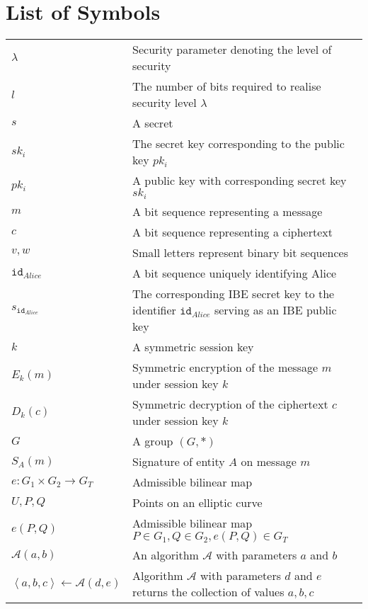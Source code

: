 \documentclass[master=eelt,masteroption=em]{kulemt}
\theoremstyle{plain}
\theoremstyle{definition}
\newcommand{\id}[1]{\ensuremath{\mathtt{id}_{#1}}}
\begin{document}
\chapter{List of Symbols}
\begin{flushleft}
 \renewcommand{\arraystretch}{1.1}
 \begin{tabularx}{\textwidth}{@{}p{30mm}X@{}}
  $\lambda$ & Security parameter denoting the level of security \\
  $l$ & The number of bits required to realise security level $\lambda$ \\
  $s$ & A secret \\
  $sk_i$ & The secret key corresponding to the public key $pk_i$ \\
  $pk_i$ & A public key with corresponding secret key $sk_i$ \\
  $m$ & A bit sequence representing a message \\
  $c$ & A bit sequence representing a ciphertext \\
  $v, w$ & Small letters represent binary bit sequences \\
  \id{Alice} & A bit sequence uniquely identifying Alice \\ 
  $s_{\id{Alice}}$ & The corresponding IBE secret key to the identifier \id{Alice} serving as an IBE public key \\
  $k$ & A symmetric session key \\
  $E_k \left( m \right)$ & Symmetric encryption of the message $m$ under session key $k$ \\
  $D_k \left( c \right)$ & Symmetric decryption of the ciphertext $c$ under session key $k$ \\
  $G$ & A group $\left( G, * \right)$ \\
  $S_A \left( m \right)$ & Signature of entity $A$ on message $m$ \\
  $e: G_1 \times G_2 \rightarrow G_T$ & Admissible bilinear map \\
  $U, P, Q$ & Points on an elliptic curve \\
  $e \left( P, Q \right)$ & Admissible bilinear map $P \in G_1, Q \in G_2, e \left( P, Q \right) \in G_T$ \\  
  $\mathcal{A} \left( a, b \right)$ & An algorithm $\mathcal{A}$ with parameters $a$ and $b$ \\
  $\left< a, b, c \right> \leftarrow \mathcal{A}( d, e )$ & Algorithm $\mathcal{A}$ with parameters $d$ and $e$ returns the collection of values $a, b, c$ \\
  \end{tabularx}
\end{flushleft}

\mainmatter








\appendixpage*          %
\appendix



\backmatter


\end{document}
